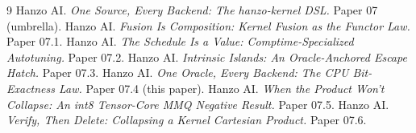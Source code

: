 \documentclass[11pt]{article}
\begin{document}
\begin{thebibliography}{9}
\small
{} Hanzo AI. \emph{One Source, Every Backend: The hanzo-kernel DSL.} Paper 07 (umbrella).
 Hanzo AI. \emph{Fusion Is Composition: Kernel Fusion as the Functor Law.} Paper 07.1.
 Hanzo AI. \emph{The Schedule Is a Value: Comptime-Specialized Autotuning.} Paper 07.2.
 Hanzo AI. \emph{Intrinsic Islands: An Oracle-Anchored Escape Hatch.} Paper 07.3.
 Hanzo AI. \emph{One Oracle, Every Backend: The CPU Bit-Exactness Law.} Paper 07.4 (this paper).
 Hanzo AI. \emph{When the Product Won't Collapse: An int8 Tensor-Core MMQ Negative Result.} Paper 07.5.
 Hanzo AI. \emph{Verify, Then Delete: Collapsing a Kernel Cartesian Product.} Paper 07.6.
\end{thebibliography}
\end{document}
